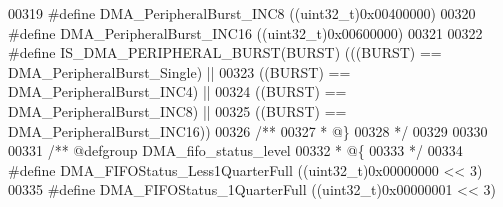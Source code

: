 \begin{DoxyCode}
00319 \textcolor{preprocessor}{#}\textcolor{preprocessor}{define} \textcolor{preprocessor}{DMA\_PeripheralBurst\_INC8}          \textcolor{preprocessor}{(}\textcolor{preprocessor}{(}\textcolor{preprocessor}{uint32\_t}\textcolor{preprocessor}{)}0x00400000\textcolor{preprocessor}{)}
00320 \textcolor{preprocessor}{#}\textcolor{preprocessor}{define} \textcolor{preprocessor}{DMA\_PeripheralBurst\_INC16}         \textcolor{preprocessor}{(}\textcolor{preprocessor}{(}\textcolor{preprocessor}{uint32\_t}\textcolor{preprocessor}{)}0x00600000\textcolor{preprocessor}{)}
00321 
00322 \textcolor{preprocessor}{#}\textcolor{preprocessor}{define} \textcolor{preprocessor}{IS\_DMA\_PERIPHERAL\_BURST}\textcolor{preprocessor}{(}\textcolor{preprocessor}{BURST}\textcolor{preprocessor}{)} \textcolor{preprocessor}{(}\textcolor{preprocessor}{(}\textcolor{preprocessor}{(}\textcolor{preprocessor}{BURST}\textcolor{preprocessor}{)} \textcolor{preprocessor}{==} 
      DMA_PeripheralBurst_Single\textcolor{preprocessor}{)} \textcolor{preprocessor}{||}
00323                                         \textcolor{preprocessor}{(}\textcolor{preprocessor}{(}\textcolor{preprocessor}{BURST}\textcolor{preprocessor}{)} \textcolor{preprocessor}{==} 
      DMA_PeripheralBurst_INC4\textcolor{preprocessor}{)}  \textcolor{preprocessor}{||}
00324                                         \textcolor{preprocessor}{(}\textcolor{preprocessor}{(}\textcolor{preprocessor}{BURST}\textcolor{preprocessor}{)} \textcolor{preprocessor}{==} 
      DMA_PeripheralBurst_INC8\textcolor{preprocessor}{)}  \textcolor{preprocessor}{||}
00325                                         \textcolor{preprocessor}{(}\textcolor{preprocessor}{(}\textcolor{preprocessor}{BURST}\textcolor{preprocessor}{)} \textcolor{preprocessor}{==} 
      DMA_PeripheralBurst_INC16\textcolor{preprocessor}{)}\textcolor{preprocessor}{)}
00326 \textcolor{comment}{/**}
00327 \textcolor{comment}{  * @\}}
00328 \textcolor{comment}{  */}
00329 
00330 
00331 \textcolor{comment}{/** @defgroup DMA\_fifo\_status\_level }
00332 \textcolor{comment}{  * @\{}
00333 \textcolor{comment}{  */}
00334 \textcolor{preprocessor}{#}\textcolor{preprocessor}{define} \textcolor{preprocessor}{DMA\_FIFOStatus\_Less1QuarterFull}   \textcolor{preprocessor}{(}\textcolor{preprocessor}{(}\textcolor{preprocessor}{uint32\_t}\textcolor{preprocessor}{)}0x00000000 \textcolor{preprocessor}{<<} 3\textcolor{preprocessor}{)}
00335 \textcolor{preprocessor}{#}\textcolor{preprocessor}{define} \textcolor{preprocessor}{DMA\_FIFOStatus\_1QuarterFull}       \textcolor{preprocessor}{(}\textcolor{preprocessor}{(}\textcolor{preprocessor}{uint32\_t}\textcolor{preprocessor}{)}0x00000001 \textcolor{preprocessor}{<<} 3\textcolor{preprocessor}{)}

\end{DoxyCode}
